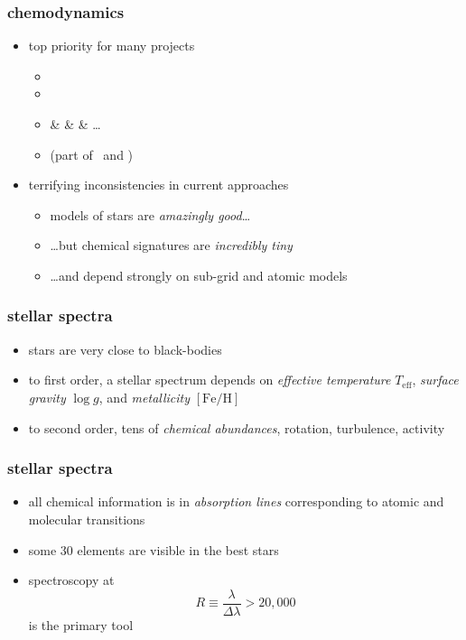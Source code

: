 \documentclass[pdftex]{beamer}
\newcommand{\teff}{T_{\mathrm{eff}}}
\newcommand{\logg}{\log g}
\newcommand{\feh}{[\mathrm{Fe / H}]}
\begin{document}
\begin{frame}
  \frametitle{chemodynamics}
  \begin{itemize}
  \item top priority for many projects
    \begin{itemize}
    \item {}
    \item \gaia
    \item {}
      \&  
      \&  
      \&  \ldots
    \item \apogee (part of \sdssiii\ and \sdssiv)
    \end{itemize}
  \item terrifying inconsistencies in current approaches
    \begin{itemize}
    \item models of stars are \emph{amazingly good}\ldots
    \item \ldots but chemical signatures are \emph{incredibly tiny}
    \item \ldots and depend strongly on sub-grid and atomic models
    \end{itemize}
  \end{itemize}
\end{frame}

\begin{frame}
  \frametitle{stellar spectra}
  \begin{itemize}
  \item<1-> stars are very close to black-bodies
  \item<1-> to first order, a stellar spectrum depends on \emph{effective temperature} $\teff$, \emph{surface gravity} $\logg$, and \emph{metallicity} $\feh$
  \item<2> to second order, tens of \emph{chemical abundances}, rotation, turbulence, activity
  \end{itemize}
\end{frame}

\begin{frame}
  \frametitle{stellar spectra}
  \begin{itemize}
  \item all chemical information is in \emph{absorption lines} corresponding to atomic and molecular transitions
  \item some 30 elements are visible in the best stars
  \item spectroscopy at $$R\equiv\frac{\lambda}{\Delta\lambda}>20,000$$ is the primary tool
  \end{itemize}
\end{frame}
\end{document}
